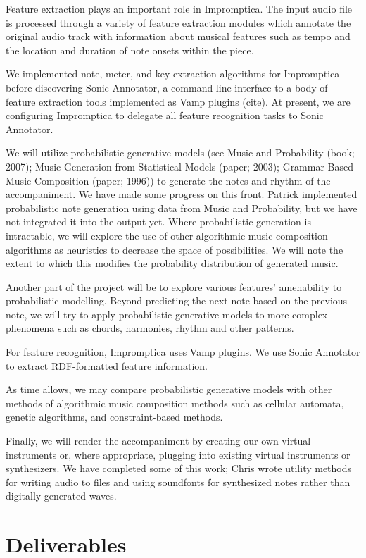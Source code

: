 \documentclass[11pt,conference,letterpaper]{IEEEtran}
\begin{document}
Feature extraction plays an important role in Impromptica. The input audio file is processed through a variety of feature extraction modules which annotate the original audio track with information about musical features such as tempo and the location and duration of note onsets within the piece.

We implemented note, meter, and key extraction algorithms for Impromptica before discovering Sonic Annotator, a command-line interface to a body of feature extraction tools implemented as Vamp plugins (cite). At present, we are configuring Impromptica to delegate all feature recognition tasks to Sonic Annotator.

We will utilize probabilistic generative models (see Music and Probability (book; 2007); Music Generation from Statistical Models (paper; 2003); Grammar Based Music Composition (paper; 1996)) to generate the notes and rhythm of the accompaniment. We have made some progress on this front. Patrick implemented probabilistic note generation using data from Music and Probability, but we have not integrated it into the output yet. Where probabilistic generation is intractable, we will explore the use of other algorithmic music composition algorithms as heuristics to decrease the space of possibilities. We will note the extent to which this modifies the probability distribution of generated music.

Another part of the project will be to explore various features’ amenability to probabilistic modelling. Beyond predicting the next note based on the previous note, we will try to apply probabilistic generative models to more complex phenomena such as chords, harmonies, rhythm and other patterns.

For feature recognition, Impromptica uses Vamp plugins. We use Sonic Annotator to extract RDF-formatted feature information.

As time allows, we may compare probabilistic generative models with other methods of algorithmic music composition methods such as cellular automata, genetic algorithms, and constraint-based methods.

Finally, we will render the accompaniment by creating our own virtual instruments or, where appropriate, plugging into existing virtual instruments or synthesizers. We have completed some of this work; Chris wrote utility methods for writing audio to files and using soundfonts for synthesized notes  rather than digitally-generated waves.

\section{Deliverables}
\end{document}
